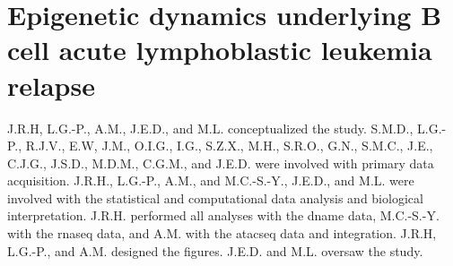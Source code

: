 \chapter{Epigenetic dynamics underlying B cell acute lymphoblastic leukemia relapse}
\label{chap:BALL}

J.R.H, L.G.-P., A.M., J.E.D., and M.L. conceptualized the study.
S.M.D., L.G.-P., R.J.V., E.W, J.M., O.I.G., I.G., S.Z.X., M.H., S.R.O., G.N., S.M.C., J.E., C.J.G., J.S.D., M.D.M., C.G.M., and J.E.D. were involved with primary data acquisition.
J.R.H., L.G.-P., A.M., and M.C.-S.-Y., J.E.D., and M.L. were involved with the statistical and computational data analysis and biological interpretation.
J.R.H. performed all analyses with the \gls{dname} data, M.C.-S.-Y. with the \gls{rnaseq} data, and A.M. with the \gls{atacseq} data and integration.
J.R.H, L.G.-P., and A.M. designed the figures.
J.E.D. and M.L. oversaw the study.






